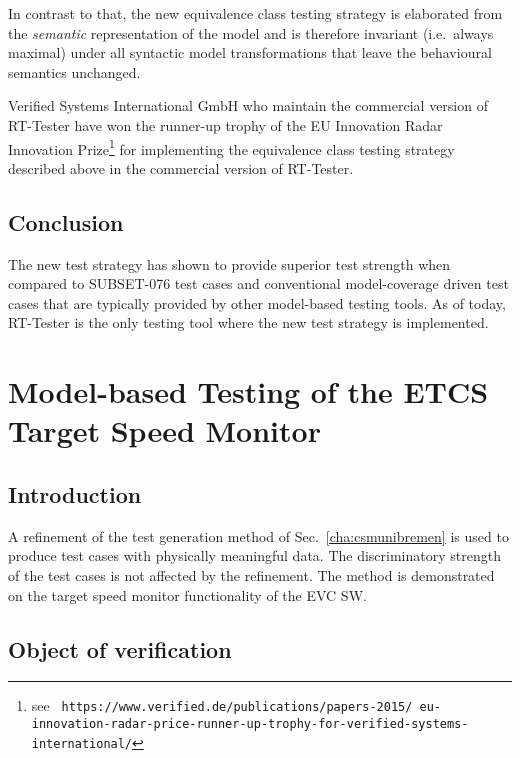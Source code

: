 In contrast to that, the new equivalence class testing strategy is elaborated from the
{\it semantic} representation of the model and is therefore invariant (i.e.~always maximal) under all syntactic model transformations that leave the behavioural semantics unchanged.

Verified Systems International GmbH who maintain the commercial
version of RT-Tester have won the runner-up trophy of the EU
Innovation Radar Innovation Prize\footnote{see {\tt
    https://www.verified.de/publications/papers-2015/\newline
    eu-innovation-radar-price-runner-up-trophy-for-verified-systems-international/}}
for implementing the equivalence class testing strategy described
above in the commercial version of RT-Tester.

\section{Conclusion}

The new test strategy has shown to provide superior test strength when compared to
SUBSET-076 test cases and conventional model-coverage driven test cases that are 
typically provided by other model-based testing tools. As of today, RT-Tester is the
only testing tool where the new test strategy is implemented.


\chapter{Model-based Testing of the ETCS Target Speed Monitor}
\label{cha:targetspeedmonitorbremen}

\section{Introduction}
A refinement of the test generation method of
Sec.~\ref{cha:csmunibremen} is used to produce test cases with
physically meaningful data. The discriminatory strength of the test
cases is not affected by the refinement. The method is demonstrated on
the target speed monitor functionality of the EVC SW.

\section{Object of verification}

